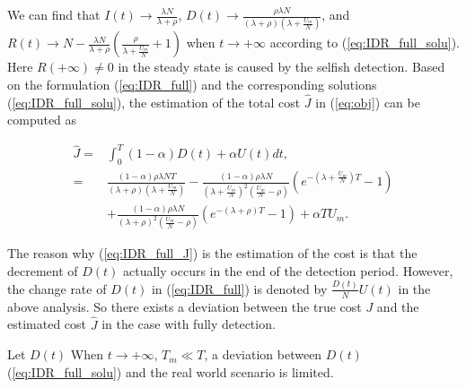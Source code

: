 We can find that $I(t) \rightarrow \frac{ \lambda N }{ \lambda + \rho }$,
$D(t) \rightarrow \frac{ \rho \lambda N }{ (\lambda + \rho)(\lambda + \frac{U_{m}}{N}) }$,
and $R(t) \rightarrow  N - \frac{ \lambda N }{ \lambda + \rho } \left( \frac{\rho}{\lambda + \frac{U_{m}}{N}} + 1 \right)$
when $t \rightarrow +\infty$ according to (\ref{eq:IDR_full_solu}).
Here $R(+\infty) \neq 0$ in the steady state is caused by the selfish detection.
Based on the formulation (\ref{eq:IDR_full}) and the corresponding solutions (\ref{eq:IDR_full_solu}),
the estimation of the total cost $\hat{J}$ in (\ref{eq:obj})
can be computed as
\begin{small}
\begin{equation}
\label{eq:IDR_full_J}
\begin{aligned}
\hat{J} =& \int_{0}^{T} (1-\alpha) D(t) + \alpha U(t) dt, \\
=& \frac{ (1-\alpha) \rho \lambda N T }{ (\lambda + \rho)(\lambda + \frac{U_{m}}{N}) }
- \frac{(1-\alpha) \rho \lambda N}{ {(\lambda + \frac{U_{m}}{N})}^{2} (\frac{U_{m}}{N} - \rho)}
(e^{-(\lambda + \frac{U_{m}}{N})T} - 1 ) \\
&+ \frac{(1-\alpha) \rho \lambda N }{ {(\lambda + \rho)}^{2} (\frac{U_{m}}{N} - \rho) }
(e^{-(\lambda + \rho)T} - 1 )
+ \alpha T U_{m}.
\end{aligned}
\end{equation}
\end{small}
The reason why (\ref{eq:IDR_full_J}) is the estimation of the cost
is that
the decrement of $D(t)$ actually occurs in the end of the detection period.
However, the change rate of $D(t)$ in (\ref{eq:IDR_full})
is denoted by $\frac{D(t)}{N}U(t)$ in the above analysis.
So there exists a deviation between the true cost $J$ and the estimated cost $\hat{J}$
in the case with fully detection.
\begin{lem}\label{lem_1}
Let $D(t)$
When $t \rightarrow +\infty$, $T_{m} \ll T$,
a deviation between $D(t)$ (\ref{eq:IDR_full_solu})
and the real world scenario is limited.
\end{lem}

